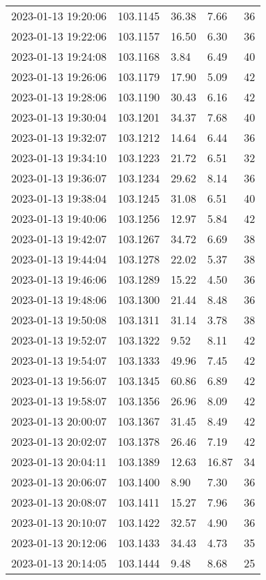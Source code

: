 \documentclass{nature_plusfigure}
\begin{document}
\begin{supplement}
\begin{center}
\begin{longtable}{lllll}
2023-01-13 19:20:06 & 103.1145 & 36.38 & 7.66 & 36 \\ 
2023-01-13 19:22:06 & 103.1157 & 16.50 & 6.30 & 36 \\ 
2023-01-13 19:24:08 & 103.1168 & 3.84 & 6.49 & 40 \\ 
2023-01-13 19:26:06 & 103.1179 & 17.90 & 5.09 & 42 \\ 
2023-01-13 19:28:06 & 103.1190 & 30.43 & 6.16 & 42 \\ 
2023-01-13 19:30:04 & 103.1201 & 34.37 & 7.68 & 40 \\ 
2023-01-13 19:32:07 & 103.1212 & 14.64 & 6.44 & 36 \\ 
2023-01-13 19:34:10 & 103.1223 & 21.72 & 6.51 & 32 \\ 
2023-01-13 19:36:07 & 103.1234 & 29.62 & 8.14 & 36 \\ 
2023-01-13 19:38:04 & 103.1245 & 31.08 & 6.51 & 40 \\ 
2023-01-13 19:40:06 & 103.1256 & 12.97 & 5.84 & 42 \\ 
2023-01-13 19:42:07 & 103.1267 & 34.72 & 6.69 & 38 \\ 
2023-01-13 19:44:04 & 103.1278 & 22.02 & 5.37 & 38 \\ 
2023-01-13 19:46:06 & 103.1289 & 15.22 & 4.50 & 36 \\ 
2023-01-13 19:48:06 & 103.1300 & 21.44 & 8.48 & 36 \\ 
2023-01-13 19:50:08 & 103.1311 & 31.14 & 3.78 & 38 \\ 
2023-01-13 19:52:07 & 103.1322 & 9.52 & 8.11 & 42 \\ 
2023-01-13 19:54:07 & 103.1333 & 49.96 & 7.45 & 42 \\ 
2023-01-13 19:56:07 & 103.1345 & 60.86 & 6.89 & 42 \\ 
2023-01-13 19:58:07 & 103.1356 & 26.96 & 8.09 & 42 \\ 
2023-01-13 20:00:07 & 103.1367 & 31.45 & 8.49 & 42 \\ 
2023-01-13 20:02:07 & 103.1378 & 26.46 & 7.19 & 42 \\ 
2023-01-13 20:04:11 & 103.1389 & 12.63 & 16.87 & 34 \\ 
2023-01-13 20:06:07 & 103.1400 & 8.90 & 7.30 & 36 \\ 
2023-01-13 20:08:07 & 103.1411 & 15.27 & 7.96 & 36 \\ 
2023-01-13 20:10:07 & 103.1422 & 32.57 & 4.90 & 36 \\ 
2023-01-13 20:12:06 & 103.1433 & 34.43 & 4.73 & 35 \\ 
2023-01-13 20:14:05 & 103.1444 & 9.48 & 8.68 & 25 \\ 

\end{longtable}
\end{center}
\end{supplement}
\end{document}
